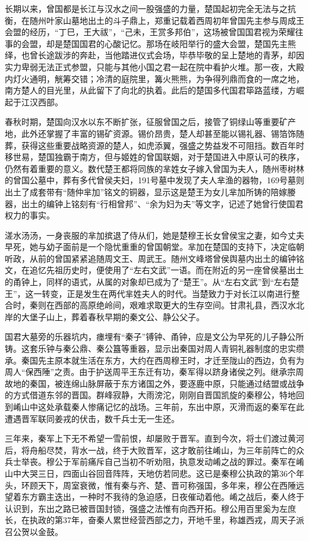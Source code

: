 长期以来，曾国都是长江与汉水之间一股强盛的力量，楚国起初完全无法与之抗衡，在随州叶家山墓地出土的斗子鼎上，郑重记载着西周初年曾国先主参与周成王会盟的经历，“丁巳，王大祓”，“己未，王赏多邦伯”，这场被曾国国君视为荣耀往事的会盟，却是楚国国君的心酸记忆。那场在岐阳举行的盛大会盟，楚国先主熊绎，也曾长途跋涉的奔赴，当他踏进仪式会场，毕恭毕敬的呈上楚地的青茅，却因实力卑弱无法正式参盟，只能与其他小国之君一起在院中看护火堆。那一夜，大殿内灯火通明，觥筹交错；冷清的庭院里，篝火熊熊，为争得列鼎而食的一席之地，南方楚人的目光里，从此留下了向北的执着。此后的楚国多代国君筚路蓝缕，方崛起于江汉西部。

春秋时期，楚国向汉水以东不断扩张，征服曾国之后，接管了铜绿山等重要矿产地，此外还掌握了丰富的锡矿资源。锡价昂贵，楚人却甚至能以锡礼器、锡箔饰随葬，获得这些重要战略资源的楚人，如虎添翼，强盛之势益发不可阻挡。数百年时移世易，楚国独霸于南方，但与姬姓的曾国联姻，对于楚国进入中原认可的秩序，仍然有着重要的意义。数代楚王都将同族的芈姓女子嫁入曾国为夫人，随州枣树林的曾国公墓中，葬有多代曾侯夫妇，191号墓中发现了夫人芈渔的器物，169号墓则出土了成套带有“随仲芈加”铭文的铜器，显示这是楚王为女儿芈加所铸的陪嫁媵器，出土的编钟上铭刻有“行相曾邦”、“余为妇为夫”等文字，记述了她曾行使国君权力的事实。

溠水汤汤，一身丧服的芈加摈退了侍从们，她是楚穆王长女曾侯宝之妻，如今丈夫早死，她与幼子面前是一个隐忧重重的曾国朝堂。芈加在楚国的支持下，决定临朝听政，从前的曾国紧紧追随周文王、周武王。随州文峰塔曾侯舆墓内出土的编钟铭文，在追忆先祖历史时，便使用了“左右文武”一语。而在附近的另一座曾侯墓出土的甬钟上，同样的语式，从属的对象却已成为了“楚王”。从“左右文武”到“左右楚王”，这一转变，正是发生在两代芈姓夫人的时代。当楚致力于对长江以南进行整合时，秦则在西部的高原绝岭间，艰难求取更大的生存空间。甘肃礼县，西汉水北岸的大堡子山上，葬着春秋早期的秦文公、静公父子。

国君大墓旁的乐器坑内，瘗埋有“秦子”镈钟、甬钟，应是文公为早死的儿子静公所铸。这套乐钟与秦公鼎、秦公簋等重器，显示出秦国对周人青铜礼器制度的忠实缵承。秦国先主原本就生活在东方，大约在西周穆王时，才迁至陇山的西边，负有为周人“保西陲”之责。由于护送周平王东迁有功，秦军得以跻身诸侯之列。继承宗周故地的秦国，被连绵山脉屏蔽于东方诸国之外，要逐鹿中原，只能通过结盟或战争的方式借道东邻的晋国。群峰寂静，大雨滂沱，刚刚自晋国凯旋的秦穆公，特地回到崤山中这处承载秦人惨痛记忆的战场。三年前，东出中原，灭滑而返的秦军在此遭遇晋军联同姜戎的伏击，数千兵士无一生还。

三年来，秦军上下无不希望一雪前恨，却屡败于晋军。直到今次，将士们渡过黄河后，将舟船尽焚，背水一战，终于大败晋军，这才敢前往崤山，为三年前阵亡的众兵士举丧。穆公于军前痛斥自己当初不听劝阻，执意发动崤之战的罪过。秦军在崤山中大哭三日，四面山谷回音阵阵，天地仿若同悲。这已是秦穆公执政的第36个年头，环顾天下，周室衰微，惟有秦与齐、楚、晋可称强国，多年来，穆公在西陲远望着东方霸主迭出，一种时不我待的急迫感，日夜催动着他。崤之战后，秦人终于认识到，东出之路已被晋国封锁，强盛之法惟有向西开拓。穆公用百里奚为左庶长，在执政的第37年，奋秦人累世经营西部之力，开地千里，称雄西戎，周天子派召公贺以金鼓。

